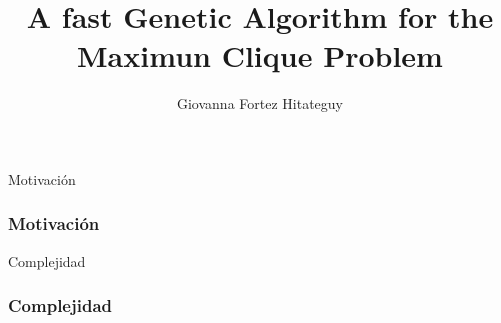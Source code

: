 \documentclass[opciones]{beamer}
\title{A fast Genetic Algorithm for the\\
 Maximun Clique Problem}
\author{Giovanna Fortez Hitateguy}
\begin{document}
\begin{frame}{Motivación}
\frametitle{Motivación}
\end{frame}
\begin{frame}{Complejidad}
\frametitle{Complejidad}
\end{frame}
\end{document}
